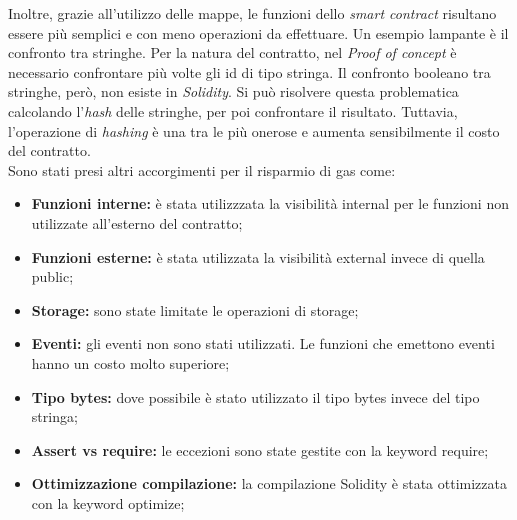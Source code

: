 Inoltre, grazie all'utilizzo delle mappe, le funzioni dello \textit{smart contract} risultano essere più semplici e con meno operazioni da effettuare. Un esempio lampante è il confronto tra stringhe. Per la natura del contratto, nel \textit{Proof of concept} è necessario confrontare più volte gli id di tipo stringa. Il confronto booleano tra stringhe, però, non esiste in \textit{Solidity}. Si può risolvere questa problematica calcolando l'\textit{hash} delle stringhe, per poi confrontare il risultato. Tuttavia, l'operazione di \textit{hashing} è una tra le più onerose e aumenta sensibilmente il costo del contratto.\\

Sono stati presi altri accorgimenti per il risparmio di gas come:
\begin{itemize}
\item{\textbf{Funzioni interne: }è stata utilizzzata la visibilità internal per le funzioni non utilizzate all'esterno del contratto;}
\item{\textbf{Funzioni esterne: }è stata utilizzata la visibilità external invece di quella public;}
\item{\textbf{Storage: }sono state limitate le operazioni di storage;}
\item{\textbf{Eventi: }gli eventi non sono stati utilizzati. Le funzioni che emettono eventi hanno un costo molto superiore;}
\item{\textbf{Tipo bytes: }dove possibile è stato utilizzato il tipo bytes invece del tipo stringa;}
\item{\textbf{Assert vs require: }le eccezioni sono state gestite con la keyword require;}
\item{\textbf{Ottimizzazione compilazione: }la compilazione Solidity è stata ottimizzata con la keyword optimize;}
\end{itemize}

